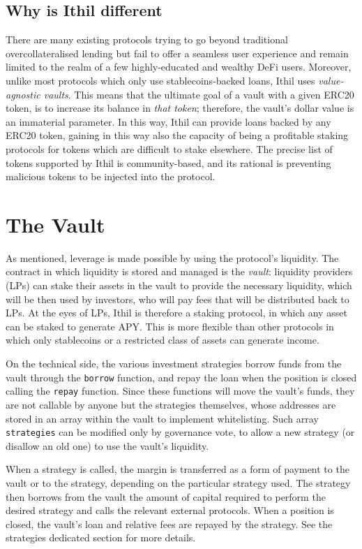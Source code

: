 \documentclass[a4paper,10 pt]{article}
\theoremstyle{definition}
\begin{document}
\subsection{Why is Ithil different}
There are many existing protocols trying to go beyond traditional overcollateralised lending but fail to offer a seamless user experience and remain limited to the realm of a few highly-educated and wealthy DeFi users. Moreover, unlike most protocols which only use stablecoins-backed loans, Ithil uses {\it value-agnostic vaults}. This means that the ultimate goal of a vault with a given ERC20 token, is to increase its balance in {\it that token}; therefore, the vault's dollar value is an immaterial parameter. In this way, Ithil can provide loans backed by any ERC20 token, gaining in this way also the capacity of being a profitable staking protocols for tokens which are difficult to stake elsewhere. The precise list of tokens supported by Ithil is community-based, and its rational is preventing malicious tokens to be injected into the protocol.

\section{The Vault}
As mentioned, leverage is made possible by using the protocol's liquidity. The contract in which liquidity is stored and managed is the {\it vault}: liquidity providers (LPs) can stake their assets in the vault to provide the necessary liquidity, which will be then used by investors, who will pay fees that will be distributed back to LPs. At the eyes of LPs, Ithil is therefore a staking protocol, in which any asset can be staked to generate APY. This is more flexible than other protocols in which only stablecoins or a restricted class of assets can generate income.

On the technical side, the various investment strategies borrow funds from the vault through the \verb|borrow| function, and repay the loan when the position is closed calling the \verb|repay| function. Since these functions will move the vault's funds, they are not callable by anyone but the strategies themselves, whose addresses are stored in an array within the vault to implement whitelisting. Such array \verb|strategies| can be modified only by governance vote, to allow a new strategy (or disallow an old one) to use the vault's liquidity.

When a strategy is called, the margin is transferred as a form of payment to the vault or to the strategy, depending on the particular strategy used. The strategy then borrows from the vault the amount of capital required to perform the desired strategy and calls the relevant external protocols. When a position is closed, the vault's loan and relative fees are repayed by the strategy. See the strategies dedicated section for more details.
\end{document}
